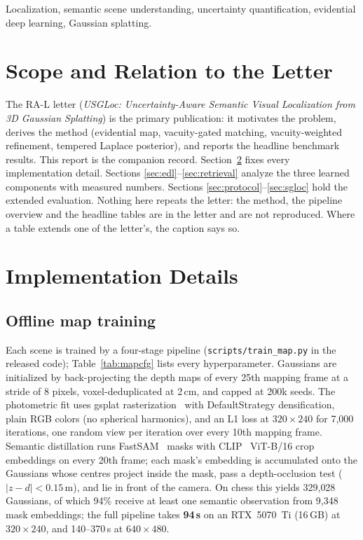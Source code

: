 \documentclass[journal]{IEEEtran}
\newcommand{\method}{USGLoc}
\begin{document}
\begin{IEEEkeywords}
Localization, semantic scene understanding, uncertainty quantification,
evidential deep learning, Gaussian splatting.
\end{IEEEkeywords}

\section{Scope and Relation to the Letter}
The RA-L letter (\emph{\method{}: Uncertainty-Aware Semantic Visual
Localization from 3D Gaussian Splatting}) is the primary publication: it
motivates the problem, derives the method (evidential map, vacuity-gated
matching, vacuity-weighted refinement, tempered Laplace posterior), and
reports the headline benchmark results. This report is the companion record.
Section~\ref{sec:impl} fixes every implementation detail. Sections
\ref{sec:edl}--\ref{sec:retrieval} analyze the three learned components with
measured numbers. Sections \ref{sec:protocol}--\ref{sec:sgloc} hold the
extended evaluation. Nothing here repeats the letter: the method, the pipeline
overview and the headline tables are in the letter and are not reproduced.
Where a table extends one of the letter's, the caption says so.

\section{Implementation Details}
\label{sec:impl}

\subsection{Offline map training}
Each scene is trained by a four-stage pipeline (\texttt{scripts/train\_map.py}
in the released code); Table~\ref{tab:mapcfg} lists every hyperparameter.
Gaussians are initialized by back-projecting the depth maps of every 25th
mapping frame at a stride of 8 pixels, voxel-deduplicated at 2\,cm, and capped
at 200k seeds. The photometric fit uses gsplat rasterization~\cite{kerbl3dgs} with
DefaultStrategy densification, plain RGB colors (no spherical harmonics), and
an L1 loss at $320{\times}240$ for 7{,}000 iterations, one random view per
iteration over every 10th mapping frame. Semantic distillation runs FastSAM~\cite{fastsam}
masks with CLIP~\cite{clip} ViT-B/16 crop embeddings on every 20th frame; each mask's
embedding is accumulated onto the Gaussians whose centres project inside the
mask, pass a depth-occlusion test ($|z-d|<0.15$\,m), and lie in front of the
camera. On chess this yields 329{,}028 Gaussians, of which 94\% receive at
least one semantic observation from 9{,}348 mask embeddings; the full
pipeline takes \textbf{94\,s} on an RTX~5070~Ti (16\,GB) at
$320{\times}240$, and 140--370\,s at $640{\times}480$.
\end{document}
